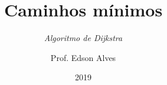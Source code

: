 \title{Caminhos mínimos}
\subtitle{\textit{Algoritmo de Dijkstra}}
\date{2019}
\author{Prof. Edson Alves}
